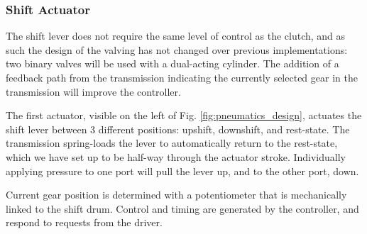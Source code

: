 \subsubsection{Shift Actuator}

The shift lever does not require the same level of control as the clutch, and as such the design of the valving has not changed over previous implementations: two binary valves will be used with a dual-acting cylinder. The addition of a feedback path from the transmission indicating the currently selected gear in the transmission will improve the controller.

The first actuator, visible on the left of Fig. \ref{fig:pneumatics_design}, actuates the shift lever between 3 different positions: upshift, downshift, and rest-state. The transmission spring-loads the lever to automatically return to the rest-state, which we have set up to be half-way through the actuator stroke. Individually applying pressure to one port will pull the lever up, and to the other port, down.

Current gear position is determined with a potentiometer that is mechanically linked to the shift drum. Control and timing are generated by the controller, and respond to requests from the driver.